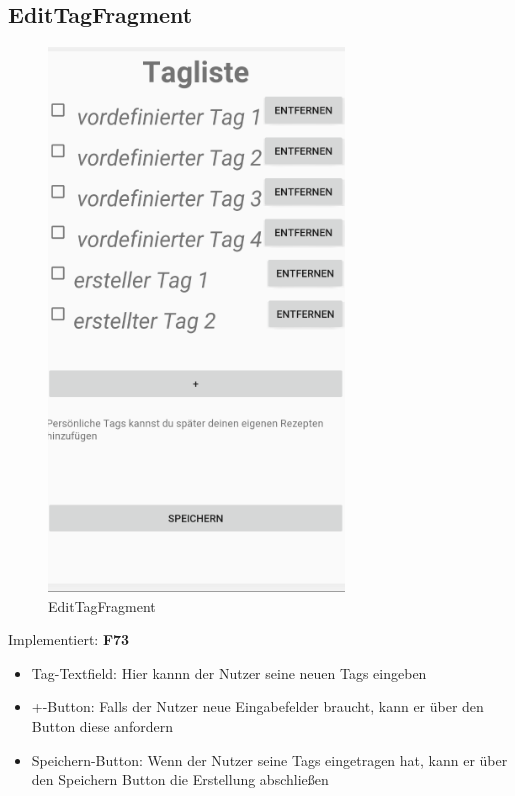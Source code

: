 \subsection{EditTagFragment}
\begin{figure}[H]
	\centering
	\includegraphics[width=0.7\textwidth]{pics/editTagFragment.png}%
	\caption{EditTagFragment}%
	\label{view}%
\end{figure}
Implementiert: \textbf{F73}
\begin{itemize}[nosep]
	\item Tag-Textfield: Hier kannn der Nutzer seine neuen Tags eingeben
	\item +-Button: Falls der Nutzer neue Eingabefelder braucht, kann er über den Button diese anfordern
	\item Speichern-Button: Wenn der Nutzer seine Tags eingetragen hat, kann er über den Speichern Button die Erstellung abschließen
\end{itemize}

